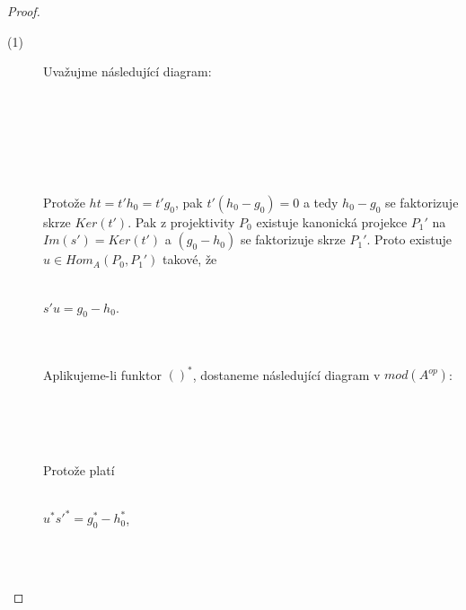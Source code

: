 \begin{proof}
       
       \begin{description}
         \item[(1)] Uvažujme následující diagram: \\\\
         \centerline{\\}\\\\\\
         Protože $ht=t'h_0=t'g_0$, pak $t'(h_0-g_0)=0$ a tedy $h_0-g_0$ se 
         faktorizuje skrze $Ker(t')$. Pak z projektivity $P_0$ existuje 
         kanonická projekce $P_1'$ na $Im(s')=Ker(t')$ a $(g_0-h_0)$ se 
         faktorizuje skrze $P_1'$. Proto existuje $u\in Hom_A(P_0,P_1')$ takové, 
         že \\\\
         \centerline{$s'u=g_0-h_0$.}\\\\
         Aplikujeme-li funktor $()^*$, dostaneme následující diagram v 
         $mod(A^{op})$:\\\\
         \centerline{\\}\\
         Protože platí 
         \\\\\centerline{$u^*s'^*=g_0^*-h_0^*$,} \\\\

\end{description}
\end{proof}
